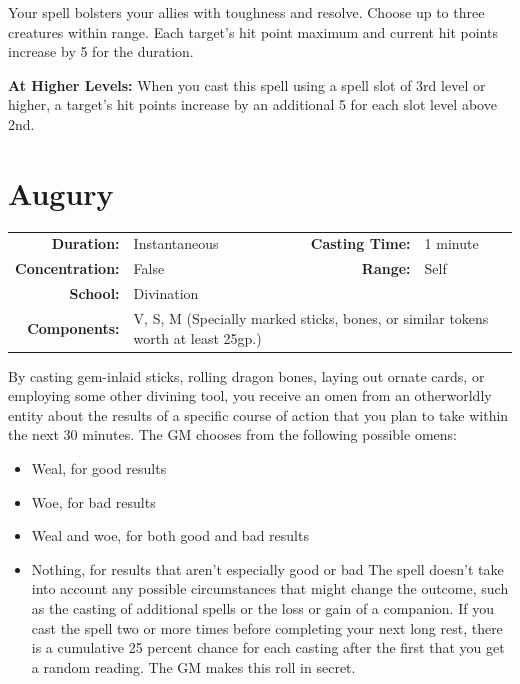 \documentclass[12pt,showtrims]{memoir}
\begin{document}
\vspace{1\baselineskip}\noindent Your spell bolsters your allies with toughness and resolve. Choose up to three creatures within range. Each target's hit point maximum and current hit points increase by 5 for the duration.

\vspace{8pt} \noindent\textbf{At Higher Levels:} When you cast this spell using a spell slot of 3rd level or higher, a target's hit points increase by an additional 5 for each slot level above 2nd.
\newpage
\section*{Augury}

{
\small\centering\vspace{-6pt}
\begin{tabular}{rlrl}
\toprule

\textbf{Duration:} & Instantaneous &
\textbf{Casting Time:} & 1 minute \\
\textbf{Concentration:} & False &
\textbf{Range:} & Self \\
\textbf{School:} & Divination \\
\textbf{Components:} & \multicolumn{3}{p{0.7\textwidth}}{V, S, M (Specially marked sticks, bones, or similar tokens worth at least 25gp.)}\\

\bottomrule
\end{tabular}
}

\vspace{1\baselineskip}\noindent By casting gem-inlaid sticks, rolling dragon bones, laying out ornate cards, or employing some other divining tool, you receive an omen from an otherworldly entity about the results of a specific course of action that you plan to take within the next 30 minutes. The GM chooses from the following possible omens:
\begin{itemize}
    \item Weal, for good results
    \item Woe, for bad results
    \item Weal and woe, for both good and bad results
    \item Nothing, for results that aren't especially good or bad The spell doesn't take into account any possible circumstances that might change the outcome, such as the casting of additional spells or the loss or gain of a companion. If you cast the spell two or more times before completing your next long rest, there is a cumulative 25 percent chance for each casting after the first that you get a random reading. The GM makes this roll in secret.
\end{itemize}
\end{document}

